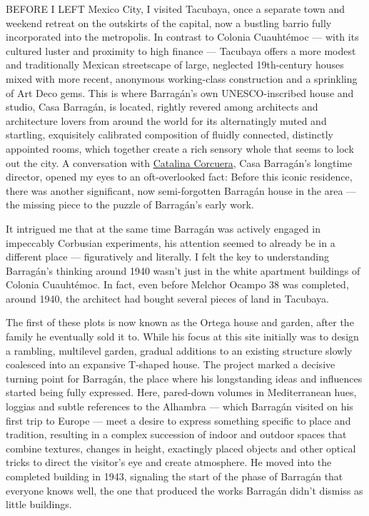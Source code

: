 BEFORE I LEFT Mexico City, I visited Tacubaya, once a separate town and
weekend retreat on the outskirts of the capital, now a bustling barrio
fully incorporated into the metropolis. In contrast to Colonia
Cuauhtémoc --- with its cultured luster and proximity to high finance
--- Tacubaya offers a more modest and traditionally Mexican streetscape
of large, neglected 19th-century houses mixed with more recent,
anonymous working-class construction and a sprinkling of Art Deco gems.
This is where Barragán's own UNESCO-inscribed house and studio, Casa
Barragán, is located, rightly revered among architects and architecture
lovers from around the world for its alternatingly muted and startling,
exquisitely calibrated composition of fluidly connected, distinctly
appointed rooms, which together create a rich sensory whole that seems
to lock out the city. A conversation with
\href{https://www.nytimes3xbfgragh.onion/2002/12/05/garden/in-mexico-city-a-quiet-revelation.html}{Catalina
Corcuera}, Casa Barragán's longtime director, opened my eyes to an
oft-overlooked fact: Before this iconic residence, there was another
significant, now semi-forgotten Barragán house in the area --- the
missing piece to the puzzle of Barragán's early work.

It intrigued me that at the same time Barragán was actively engaged in
impeccably Corbusian experiments, his attention seemed to already be in
a different place --- figuratively and literally. I felt the key to
understanding Barragán's thinking around 1940 wasn't just in the white
apartment buildings of Colonia Cuauhtémoc. In fact, even before Melchor
Ocampo 38 was completed, around 1940, the architect had bought several
pieces of land in Tacubaya.

The first of these plots is now known as the Ortega house and garden,
after the family he eventually sold it to. While his focus at this site
initially was to design a rambling, multilevel garden, gradual additions
to an existing structure slowly coalesced into an expansive T-shaped
house. The project marked a decisive turning point for Barragán, the
place where his longstanding ideas and influences started being fully
expressed. Here, pared-down volumes in Mediterranean hues, loggias and
subtle references to the Alhambra --- which Barragán visited on his
first trip to Europe --- meet a desire to express something specific to
place and tradition, resulting in a complex succession of indoor and
outdoor spaces that combine textures, changes in height, exactingly
placed objects and other optical tricks to direct the visitor's eye and
create atmosphere. He moved into the completed building in 1943,
signaling the start of the phase of Barragán that everyone knows well,
the one that produced the works Barragán didn't dismiss as little
buildings.

